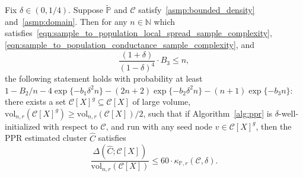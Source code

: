 \documentclass[11pt,twoside]{article}
\newcommand{\1}{\mathbf{1}}
\newcommand{\mc}[1]{\mathcal{#1}}
\newcommand{\Pbb}{\mathbb{P}}
\newcommand{\wt}[1]{\widetilde{#1}}
\newcommand{\wh}[1]{\widehat{#1}}
\newcommand{\vol}{\mathrm{vol}}
\begin{document}
\begin{theorem}
	\label{thm:volume_ssd_ub} 
	Fix $\delta \in (0,1/4)$. Suppose $\wt{\Pbb}$ and $\mc{C}$ satisfy~\ref{asmp:bounded_density} and~\ref{asmp:domain}. Then for any $n \in \mathbb{N}$ which satisfies~\eqref{eqn:sample_to_population_local_spread_sample_complexity}, \eqref{eqn:sample_to_population_conductance_sample_complexity}, and
	\begin{equation}
	\label{eqn:volume_ssd_ub_sample_complexity}
	\frac{(1 + \delta)}{(1 - \delta)^4} \cdot B_3 \leq n,
	\end{equation} 
	the following statement holds with probability at least $1 - B_2/n - 4\exp\{-b_1\delta^2n\} - (2n + 2)\exp\{-b_2\delta^2n\} - (n + 1)\exp\{-b_3n\}$: there exists a set $\mc{C}[X]^g \subseteq \mc{C}[X]$ of large volume, $\vol_{n,r}(\mc{C}[X]^g) \geq \vol_{n,r}(\mc{C}[X])/2$, such that if Algorithm~\ref{alg:ppr} is $\delta$-well-initialized with respect to $\mc{C}$, and run with any seed node $v \in \mc{C}[X]^g$, then the PPR estimated cluster $\wh{C}$ satisfies
	\begin{equation}
	\label{eqn:volume_ssd_ub}
	\frac{\Delta(\wh{C};\mc{C}[X])}{\vol_{n,r}(\mc{C}[X])} \leq 60 \cdot \kappa_{\Pbb,r}(\mc{C},\delta).
	\end{equation}
\end{theorem}
%
% 
\end{document}
